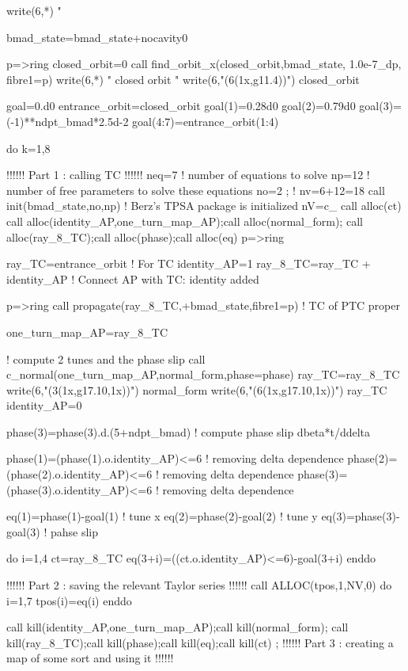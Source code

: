 \documentclass{hitec}     %
\begin{document}
{{{{{{\begin{code}
write(6,*) " %

bmad_state=bmad_state+nocavity0

p=>ring%
closed_orbit=0
call find_orbit_x(closed_orbit,bmad_state, 1.0e-7_dp, fibre1=p)
write(6,*) " closed orbit "
write(6,"(6(1x,g11.4))") closed_orbit
 
goal=0.d0
entrance_orbit=closed_orbit
goal(1)=0.28d0
goal(2)=0.79d0
goal(3)=(-1)**ndpt_bmad*2.5d-2
goal(4:7)=entrance_orbit(1:4)

do k=1,8

!!!!!! Part 1 : calling TC !!!!!!
neq=7     ! number of equations to solve
np=12     ! number of free parameters to solve these equations
no=2 ;    ! nv=6+12=18
call init(bmad_state,no,np)   ! Berz's TPSA package is initialized
nV=c_%
call alloc(ct)  
call alloc(identity_AP,one_turn_map_AP);call alloc(normal_form);
call alloc(ray_8_TC);call alloc(phase);call alloc(eq)
p=>ring%
   
ray_TC=entrance_orbit   !  For TC
identity_AP=1
ray_8_TC=ray_TC + identity_AP ! Connect AP with TC: identity added
 
p=>ring%
call propagate(ray_8_TC,+bmad_state,fibre1=p) !  TC of PTC proper
 
one_turn_map_AP=ray_8_TC

! compute 2 tunes and the phase slip
call c_normal(one_turn_map_AP,normal_form,phase=phase) 
ray_TC=ray_8_TC
write(6,"(3(1x,g17.10,1x))") normal_form%
write(6,"(6(1x,g17.10,1x))") ray_TC%
 identity_AP=0

phase(3)=phase(3).d.(5+ndpt_bmad)    ! compute phase slip dbeta*t/ddelta 
 
phase(1)=(phase(1).o.identity_AP)<=6  ! removing delta dependence
phase(2)=(phase(2).o.identity_AP)<=6  ! removing delta dependence
phase(3)=(phase(3).o.identity_AP)<=6  ! removing delta dependence
 

eq(1)=phase(1)-goal(1)  ! tune x
eq(2)=phase(2)-goal(2)  ! tune y
eq(3)=phase(3)-goal(3)  ! pahse slip  
 
do i=1,4
ct=ray_8_TC%
eq(3+i)=((ct.o.identity_AP)<=6)-goal(3+i)
enddo

!!!!!! Part 2 : saving the relevant Taylor series  !!!!!!
   call ALLOC(tpos,1,NV,0)
do i=1,7
 tpos(i)=eq(i)
enddo


call kill(identity_AP,one_turn_map_AP);call kill(normal_form);
call kill(ray_8_TC);call kill(phase);call kill(eq);call kill(ct)  ;
!!!!!! Part 3 : creating a map of some sort and using it !!!!!!


\end{code}}}}}}}
\end{document}
